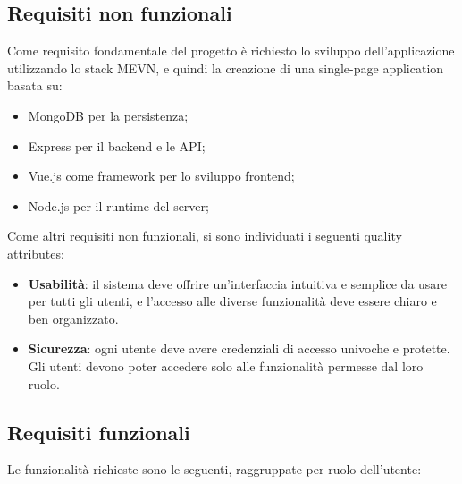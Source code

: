 \documentclass{report}
\begin{document}
\subsection{Requisiti non funzionali}
\par Come requisito fondamentale del progetto è richiesto lo sviluppo dell'applicazione utilizzando lo stack MEVN, e quindi la creazione di una single-page application basata su:
\begin{itemize}
    \item MongoDB per la persistenza;
    \item Express per il backend e le API;
    \item Vue.js come framework per lo sviluppo frontend; 
    \item Node.js per il runtime del server;
\end{itemize}
\par Come altri requisiti non funzionali, si sono individuati i seguenti quality attributes:
\begin{itemize}
    \item \textbf{Usabilità}: il sistema deve offrire un'interfaccia intuitiva e semplice da usare per tutti gli utenti, e l'accesso alle diverse funzionalità deve essere chiaro e ben organizzato.
    \item \textbf{Sicurezza}: ogni utente deve avere credenziali di accesso univoche e protette. Gli utenti devono poter accedere solo alle funzionalità permesse dal loro ruolo.
\end{itemize}
\subsection{Requisiti funzionali}
\par Le funzionalità richieste sono le seguenti, raggruppate per ruolo dell'utente:
\end{document}
